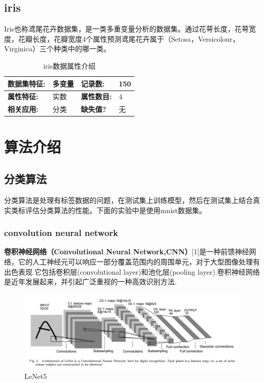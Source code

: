 \documentclass{article}
\begin{document}
\subsection{iris}
Iris也称鸢尾花卉数据集，是一类多重变量分析的数据集。通过花萼长度，花萼宽度，花瓣长度，花瓣宽度4个属性预测鸢尾花卉属于（Setosa，Versicolour，Virginica）三个种类中的哪一类。

\begin{table}

\begin{tabularx}{\textwidth}{|X|X|X|X|}
\hline
\textbf{数据集特征:} & 多变量 & \textbf{记录数:} & 150 \\
\hline
\textbf{属性特征:} & 实数 & \textbf{属性数目:} & 4 \\
\hline
\textbf{相关应用:} & 分类 & \textbf{缺失值?} & 无 \\
\hline
\end{tabularx}
\caption{iris数据属性介绍}
\end{table}


\section{算法介绍}
	\subsection{分类算法}
	分类算法是处理有标签数据的问题，在测试集上训练模型，然后在测试集上结合真实类标评估分类算法的性能。下面的实验中是使用mnist数据集。
	\subsubsection{convolution neural network}
	\textbf{卷积神经网络（Convolutional Neural Network,CNN）}[1]是一种前馈神经网络，它的人工神经元可以响应一部分覆盖范围内的周围单元，对于大型图像处理有出色表现.它包括卷积层(convolutional layer)和池化层(pooling layer).卷积神经网络是近年发展起来，并引起广泛重视的一种高效识别方法.
	\begin{figure}[htbp]
	\centering\includegraphics[scale=0.6]{cnn}
	\caption{LeNet5}\label{fig:2}
	\end{figure}
\end{document}
